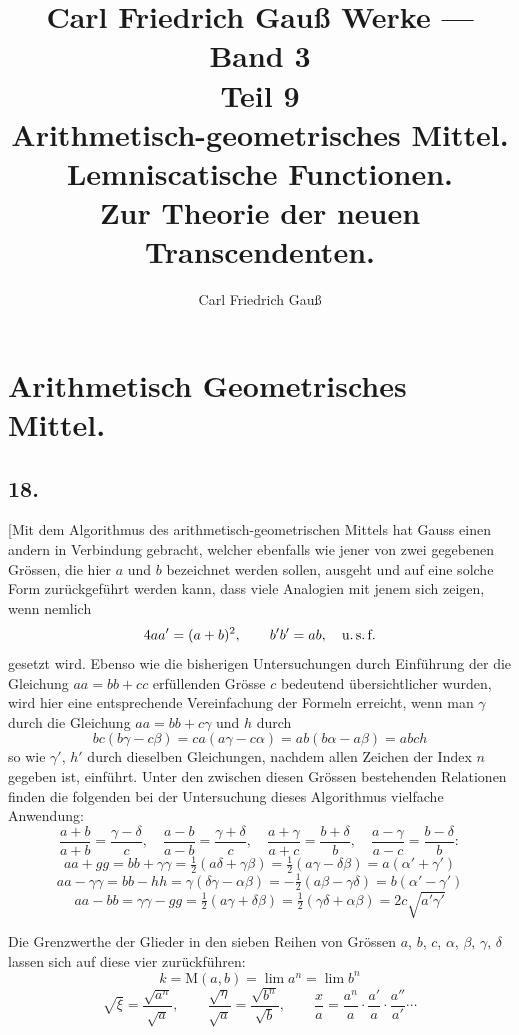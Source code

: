 \documentclass[10pt,a4paper]{article}
\title{\Huge Carl Friedrich Gauß Werke --- Band 3\\[0.5em]
\Large Teil 9\\[1em]
\large Arithmetisch-geometrisches Mittel.\\
Lemniscatische Functionen.\\
Zur Theorie der neuen Transcendenten.}
\author{Carl Friedrich Gauß}
\date{}
\newcommand{\M}{\text{M}}
\begin{document}
\maketitle
\thispagestyle{empty}

\tableofcontents
\newpage

\section*{Arithmetisch Geometrisches Mittel.}

\subsection*{18.}

[Mit dem Algorithmus des arithmetisch-geometrischen Mittels hat Gauss
einen andern in Verbindung gebracht, welcher ebenfalls wie jener von zwei
gegebenen Grössen, die hier $a$ und $b$ bezeichnet werden sollen, ausgeht und auf
eine solche Form zurückgeführt werden kann, dass viele Analogien mit jenem
sich zeigen, wenn nemlich
\[
4aa'=(a+b)^2, \qquad b'b'=ab, \quad \text{u.\,s.\,f.}
\]
gesetzt wird. Ebenso wie die bisherigen Untersuchungen durch Einführung der
die Gleichung $aa=bb+cc$ erfüllenden Grösse $c$ bedeutend übersichtlicher
wurden, wird hier eine entsprechende Vereinfachung der Formeln erreicht, wenn
man $\gamma$ durch die Gleichung $aa=bb+c\gamma$ und $h$ durch
\[
bc(b\gamma-c\beta)=ca(a\gamma-c\alpha)=ab(b\alpha-a\beta)=abch
\]
so wie $\gamma'$, $h'$ durch dieselben Gleichungen, nachdem allen Zeichen der Index $n$
gegeben ist, einführt. Unter den zwischen diesen Grössen bestehenden Relationen
finden die folgenden bei der Untersuchung dieses Algorithmus vielfache Anwendung:
\[
\frac{a+b}{a+b}=\frac{\gamma-\delta}{c}, \quad
\frac{a-b}{a-b}=\frac{\gamma+\delta}{c}, \quad
\frac{a+\gamma}{a+c}=\frac{b+\delta}{b}, \quad
\frac{a-\gamma}{a-c}=\frac{b-\delta}{b}:
\]
\[
aa+gg=bb+\gamma\gamma=\tfrac12(a\delta+\gamma\beta)=\tfrac12(a\gamma-\delta\beta)=a(\alpha'+\gamma')
\]
\[
aa-\gamma\gamma=bb-hh=\gamma(\delta\gamma-\alpha\beta)=-\tfrac12(a\beta-\gamma\delta)=b(\alpha'-\gamma')
\]
\[
aa-bb=\gamma\gamma-gg=\tfrac12(a\gamma+\delta\beta)=\tfrac12(\gamma\delta+\alpha\beta)=2c\sqrt{a'\gamma'}
\]

Die Grenzwerthe der Glieder in den sieben Reihen von Grössen $a$, $b$, $c$, $\alpha$, $\beta$, $\gamma$, $\delta$
lassen sich auf diese vier zurückführen:
\[
k = \M(a,b) = \lim a^n = \lim b^n
\]
\[
\sqrt{\xi}=\frac{\sqrt{a^n}}{\sqrt{a}}, \qquad
\frac{\sqrt{\eta}}{\sqrt{a}}=\frac{\sqrt{b^n}}{\sqrt{b}}, \qquad
\frac{x}{a}=\frac{a^n}{a}\cdot\frac{a'}{a}\cdot\frac{a''}{a'}\cdots
\]
\end{document}
